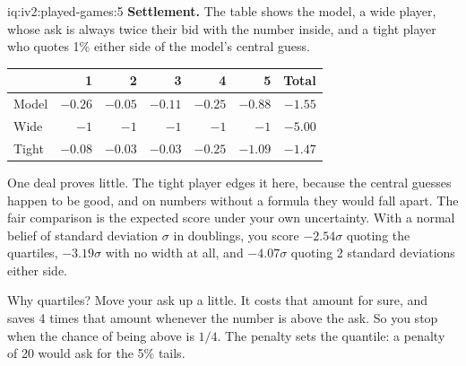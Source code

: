 \begin{solution}{iq:iv2:played-games:5}
\medskip
\textbf{Settlement.} The table shows the model, a wide player, whose ask is always twice their bid with the number inside, and a tight player who quotes 1\% either side of the model's central guess.
\begin{center}\small
\begin{tabular}{@{}lrrrrrr@{}}
 & 1 & 2 & 3 & 4 & 5 & Total \\ \hline
Model & $-0.26$ & $-0.05$ & $-0.11$ & $-0.25$ & $-0.88$ & $-1.55$ \\
Wide & $-1$ & $-1$ & $-1$ & $-1$ & $-1$ & $-5.00$ \\
Tight & $-0.08$ & $-0.03$ & $-0.03$ & $-0.25$ & $-1.09$ & $-1.47$
\end{tabular}
\end{center}
One deal proves little. The tight player edges it here, because the central guesses happen to be good, and on numbers without a formula they would fall apart. The fair comparison is the expected score under your own uncertainty. With a normal belief of standard deviation $\sigma$ in doublings, you score $-2.54\sigma$ quoting the quartiles, $-3.19\sigma$ with no width at all, and $-4.07\sigma$ quoting 2 standard deviations either side.

Why quartiles? Move your ask up a little. It costs that amount for sure, and saves 4 times that amount whenever the number is above the ask. So you stop when the chance of being above is $1/4$. The penalty sets the quantile: a penalty of 20 would ask for the 5\% tails.

\end{solution}

